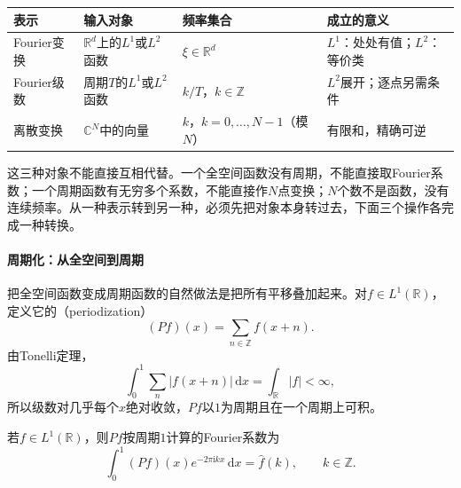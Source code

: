 \begin{BookInlineTable}
  \centering
  \small
  \begin{tabularx}{\linewidth}{@{}l>{\raggedright\arraybackslash}X>{\raggedright\arraybackslash}X>{\raggedright\arraybackslash}X@{}}
    \toprule
    表示 & 输入对象 & 频率集合 & 成立的意义\\
    \midrule
    Fourier变换 & $\mathbb R^d$上的$L^1$或$L^2$函数 & $\xi\in\mathbb R^d$ & $L^1$：处处有值；$L^2$：等价类\\
    Fourier级数 & 周期$T$的$L^1$或$L^2$函数 & $k/T$，$k\in\mathbb Z$ & $L^2$展开；逐点另需条件\\
    离散变换 & $\mathbb C^N$中的向量 & $k$，$k=0,\ldots,N-1$（模$N$） & 有限和，精确可逆\\
    \bottomrule
  \end{tabularx}
  \caption{三种Fourier表示的输入对象、频率集合与成立意义。表中周期情形写成一般周期$T$，第~\ref{sec:fourier-series}节取$T=2\pi$。}
  \label{tab:fourier-three-representations}
\end{BookInlineTable}

这三种对象不能直接互相代替。一个全空间函数没有周期，不能直接取Fourier系数；一个周期函数有无穷多个系数，不能直接作$N$点变换；$N$个数不是函数，没有连续频率。从一种表示转到另一种，必须先把对象本身转过去，下面三个操作各完成一种转换。

\paragraph{周期化：从全空间到周期}

把全空间函数变成周期函数的自然做法是把所有平移叠加起来。对$f\in L^1(\mathbb R)$，定义它的（periodization）
\begin{equation}
(Pf)(x)=\sum_{n\in\mathbb Z}f(x+n).
\label{eq:fourier-periodization}
\end{equation}
由Tonelli定理，
\[
\int_0^1\sum_n\lvert f(x+n)\rvert\,\mathrm dx=\int_{\mathbb R}\lvert f\rvert<\infty,
\]
所以级数对几乎每个$x$绝对收敛，$Pf$以$1$为周期且在一个周期上可积。

\begin{theorem}[周期化的系数]
\label{thm:fourier-periodization}
若$f\in L^1(\mathbb R)$，则$Pf$按周期$1$计算的Fourier系数为
\begin{equation}
\int_0^1(Pf)(x)e^{-2\pi\mathrm ikx}\,\mathrm dx=\widehat f(k),\qquad k\in\mathbb Z .
\label{eq:fourier-periodization-coefficient}
\end{equation}
\end{theorem}

